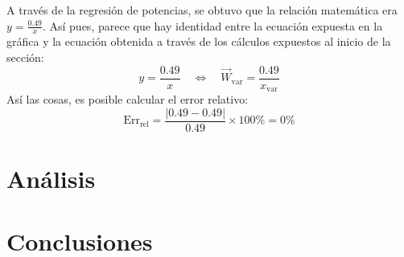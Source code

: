 \documentclass{article}
\begin{document}
A través de la regresión de potencias, se obtuvo que la relación matemática era \( y = \frac{0.49}{x} \). Así pues, parece que hay identidad entre la ecuación expuesta en la gráfica y la ecuación obtenida a través de los cálculos expuestos al inicio de la sección:
\[
y = \frac{0.49}{x} \quad \Leftrightarrow \quad \vec{W}_{\text{var}} = \frac{0.49}{x_{\text{var}}}
\]
Así las cosas, es posible calcular el error relativo:
\[
\text{Err}_{\text{rel}} = \frac{|0.49 - 0.49|}{0.49} \times 100\% = 0\%
\]

\section*{Análisis}


\section*{Conclusiones}




\end{document}
